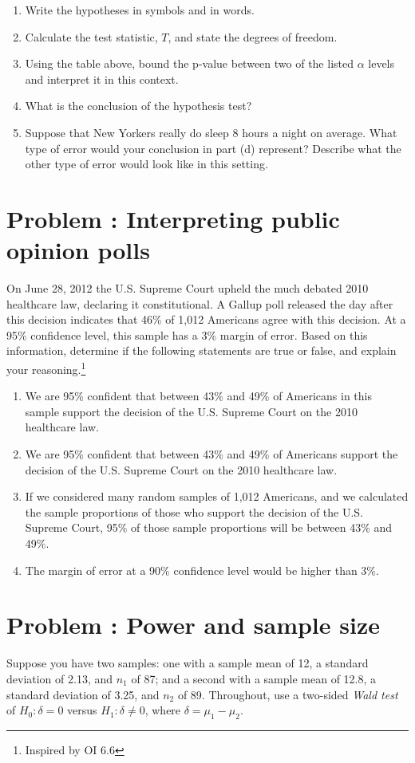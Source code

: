 \documentclass[11pt]{article}
\newcounter{problem}
\newcommand{\problem}[1]{\refstepcounter{problem}\section*{Problem \theproblem: #1}}
\begin{document}
\begin{enumerate}[label=\alph*.]
\item Write the hypotheses in symbols and in words.
\item Calculate the test statistic, \(T\), and state the degrees of
  freedom.
\item Using the table above, bound the p-value between two of the
  listed \(\alpha\) levels and interpret it in this context.
\item What is the conclusion of the hypothesis test?
\item Suppose that New Yorkers really do sleep 8 hours a night on
  average. What type of error would your conclusion in part (d)
  represent? Describe what the other type of error would look like in
  this setting.
\end{enumerate}

\problem{Interpreting public opinion polls}

On June 28, 2012 the U.S. Supreme Court upheld the much debated 2010
healthcare law, declaring it constitutional. A Gallup poll released
the day after this decision indicates that 46\% of 1,012 Americans
agree with this decision. At a 95\% confidence level, this sample has
a 3\% margin of error. Based on this information, determine if the
following statements are true or false, and explain your
reasoning.\footnote{Inspired by OI 6.6}

\begin{enumerate}[label=\alph*.]
\item We are 95\% confident that between 43\% and 49\% of Americans in
  this sample support the decision of the U.S. Supreme Court on the
  2010 healthcare law.
\item We are 95\% confident that between 43\% and 49\% of Americans
  support the decision of the U.S. Supreme Court on the 2010
  healthcare law.
\item If we considered many random samples of 1,012 Americans, and we
  calculated the sample proportions of those who support the decision
  of the U.S. Supreme Court, 95\% of those sample proportions will be
  between 43\% and 49\%.
\item The margin of error at a 90\% confidence level would be higher
  than 3\%.
\end{enumerate}

\problem{Power and sample size}

Suppose you have two samples: one with a sample mean of 12, a standard
deviation of 2.13, and \(n_1\) of 87; and a second with a sample mean
of 12.8, a standard deviation of 3.25, and \(n_2\) of 89. Throughout,
use a two-sided \emph{Wald test} of \(H_0: \delta = 0\) versus
\(H_1: \delta \neq 0\), where \(\delta = \mu_1 - \mu_2\).
\end{document}
